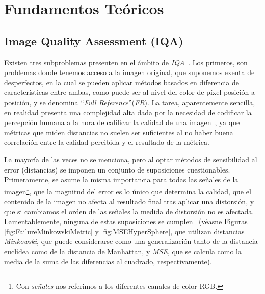 \chapter{Fundamentos Teóricos}
\section{Image Quality Assessment (IQA)}
\label{sec:IQA}
Existen tres subproblemas presenten en el ámbito de \emph{IQA}~\cite{RecentIQASurvey, IQABook, VisualMedicalQualityBook}. Los primeros, son problemas 
donde tenemos acceso a la imagen original, que suponemos exenta de desperfectos, 
en la cual se pueden aplicar métodos basados en diferencia de características 
entre ambas, como puede ser al nivel del color de píxel posición a posición,
y se denomina ``\emph{Full Reference}''(\emph{FR}). 
La tarea, aparentemente sencilla, en realidad presenta una complejidad alta dada por 
la necesidad de codificar la percepción humana a la hora de calificar la calidad 
de una imagen~\cite{WhyIsIQASoDifficult}, ya que métricas que miden distancias no suelen 
ser suficientes al no haber buena correlación entre la calidad percibida y el 
resultado de la métrica.

La mayoría de las veces no se menciona, pero al optar métodos de sensibilidad 
al error (distancias) se imponen un conjunto de suposiciones cuestionables. 
Primeramente, se asume la misma importancia para todas las señales de la imagen\footnote{
  Con \emph{señales} nos referimos a los diferentes canales de color RGB.
}, que
la magnitud del error es lo único que determina la calidad, que el contenido de la imagen 
no afecta al resultado final tras aplicar una distorsión, y que si cambiamos el 
orden de las señales la medida de distorsión no es afectada.
Lamentablemente, ninguna de estas suposiciones se cumplen~\cite{Wang2006ModernIQ} (véasne Figuras \ref{fig:FailureMinkowskiMetric} y \ref{fig:MSEHyperSphere}, 
que utilizan distancias \emph{Minkowski}, 
que puede considerarse como una generalización tanto de 
la distancia euclídea como de la distancia de Manhattan, 
y \emph{MSE}, 
que se calcula como la media de la suma de las 
diferencias al cuadrado, respectivamente).


